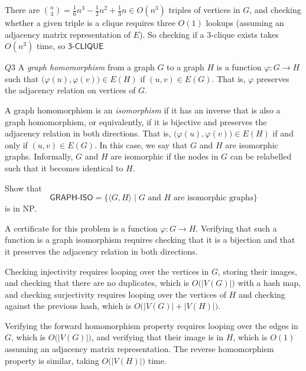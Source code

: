 \documentclass{article}
\theoremstyle{definition}
\theoremstyle{definition}
\theoremstyle{remark}
\begin{document}
\bigskip

There are $\binom{n}{3}=\frac{1}{6}n^3-\frac{1}{2}n^2+\frac{1}{3}n\in O(n^3)$ triples of vertices in $G$, and checking whether a given triple is a clique requires three $O(1)$ lookups (assuming an adjacency matrix representation of $E$). So checking if a $3$-clique exists takes $O(n^3)$ time, so $\textsf{3-CLIQUE}$






\begin{questionbox}{$Q3$}
    A \textit{graph homomorphism} from a graph $G$ to a graph $H$ is a function $\varphi:G\rightarrow H$ such that $\bigl(\varphi(u),\varphi(v)\bigr)\in E(H)$ if $(u,v)\in E(G)$. That is, $\varphi$ preserves the adjacency relation on vertices of $G$.
    
    A graph homomorphism is an \textit{isomorphism} if it has an inverse that is also a graph homomorphism, or equivalently, if it is bijective and preserves the adjacency relation in both directions. That is, $\bigl(\varphi(u),\varphi(v)\bigr)\in E(H)$ if and only if $(u,v)\in E(G)$. In this case, we say that $G$ and $H$ are isomorphic graphs. Informally, $G$ and $H$ are isomorphic if the nodes in $G$ can be relabelled such that it becomes identical to $H$.

    Show that
    \begin{equation*}
        \textsf{GRAPH-ISO}=\bigl\{\langle G,H\rangle\mid G\text{ and }H\text{ are isomorphic graphs}\bigr\}
    \end{equation*}
    is in $\mathrm{NP}$.
\end{questionbox}

\bigskip

A certificate for this problem is a function $\varphi:G\rightarrow H$. Verifying that such a function is a graph isomorphism requires checking that it is a bijection and that it preserves the adjacency relation in both directions.

Checking injectivity requires looping over the vertices in $G$, storing their images, and checking that there are no duplicates, which is $O\bigl(|V(G)|\bigr)$ with a hash map, and checking surjectivity requires looping over the vertices of $H$ and checking against the previous hash, which is $O\bigl(|V(G)|+|V(H)|\bigr)$.

Verifying the forward homomorphism property requires looping over the edges in $G$, which is $O\bigl(|V(G)|\bigr)$, and verifying that their image is in $H$, which is $O(1)$ assuming an adjacency matrix representation. The reverse homomorphism property is similar, taking $O\bigl(|V(H)|\bigr)$ time.
\end{document}
